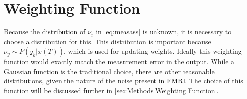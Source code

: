 \section{Weighting Function}
Because the distribution of $\nu_y$ in \autoref{eq:measass} is unknown,
it is necessary to choose a distribution for this. This distribution
is important because $\nu_y \sim P(y_k | x(T))$, which is used
for updating weights. Ideally this weighting function would exactly 
match the measurement error in the output. 
While a Gaussian function is the traditional choice, there are other reasonable
distributions, given the nature of the noise present in FMRI.
The choice of this function will be discussed further in \autoref{sec:Methods Weighting Function}.

%
%

